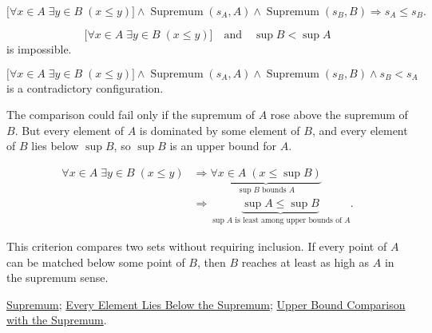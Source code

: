 \begin{remark*}
\[
\bigl[\forall x\in A\;\exists y\in B\;(x\le y)\bigr]
\land
\operatorname{Supremum}(s_A,A)\land \operatorname{Supremum}(s_B,B)
\Longrightarrow
s_A\le s_B.
\]
\end{remark*}

\begin{remark*}
\[
\bigl[\forall x\in A\;\exists y\in B\;(x\le y)\bigr]
\quad\text{and}\quad
\sup B<\sup A
\]
is impossible.
\end{remark*}

\begin{remark*}
\[
\bigl[\forall x\in A\;\exists y\in B\;(x\le y)\bigr]
\land
\operatorname{Supremum}(s_A,A)\land \operatorname{Supremum}(s_B,B)\land s_B<s_A
\]
is a contradictory configuration.
\end{remark*}

\begin{remark*}
The comparison could fail only if the supremum of $A$ rose above the supremum of $B$. But every element of $A$ is dominated by some element of $B$, and every element of $B$ lies below $\sup B$, so $\sup B$ is an upper bound for $A$.
\end{remark*}

\begin{remark*}
\[
\begin{aligned}
\forall x\in A\;\exists y\in B\;(x\le y)
&\Longrightarrow
\underbrace{\forall x\in A\;(x\le \sup B)}_{\sup B\text{ bounds }A}\\
&\Longrightarrow
\underbrace{\sup A\le \sup B}_{\sup A\text{ is least among upper bounds of }A}.
\end{aligned}
\]
\end{remark*}

\begin{remark*}[Interpretation]
This criterion compares two sets without requiring inclusion. If every point of $A$ can be matched below some point of $B$, then $B$ reaches at least as high as $A$ in the supremum sense.
\end{remark*}

\begin{dependencies}
\hyperref[def:supremum]{Supremum};
\hyperref[prop:every-element-lies-below-the-supremum]{Every Element Lies Below the Supremum};
\hyperref[prop:upper-bound-comparison-with-the-supremum]{Upper Bound Comparison with the Supremum}.
\end{dependencies}





